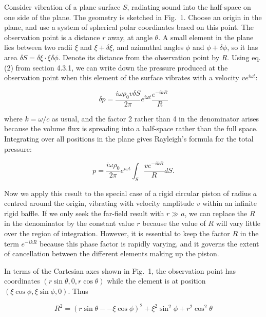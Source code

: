   Consider vibration of a plane surface $S$, radiating sound into the 
  half-space on one side of the plane. The geometry is sketched in Fig.\ 1. 
  Choose an origin in the plane, and use a system of spherical polar 
  coordinates based on this point. The observation point is a distance $r$ 
  away, at angle $\theta$. A small element in the plane lies between two radii 
  $\xi$ and $\xi+\delta \xi$, and azimuthal angles $\phi$ and $\phi + \delta 
  \phi$, so it has area $\delta S= \delta \xi \cdot \xi \delta \phi$. Denote 
  its distance from the observation point by $R$. Using eq. (2) from section 
  4.3.1, we can write down the pressure produced at the observation point when 
  this element of the surface vibrates with a velocity $v e^{i \omega t}$: 

  $$\delta p = \dfrac{i \omega \rho_0 v \delta S}{2 \pi} e^{i \omega t} 
  \dfrac{e^{-i k R}}{R} \tag{1}$$ 

  where $k=\omega /c$ as usual, and the factor 2 rather than 4 in the 
  denominator arises because the volume flux is spreading into a half-space 
  rather than the full space. Integrating over all positions in the plane gives 
  Rayleigh's formula for the total pressure: 

  $$p = \dfrac{i \omega \rho_0}{2 \pi} e^{i \omega t} \int_S{\dfrac{v e^{-i k 
  R}}{R} dS} . \tag{2}$$ 


  Now we apply this result to the special case of a rigid circular piston of 
  radius $a$ centred around the origin, vibrating with velocity amplitude $v$ 
  within an infinite rigid baffle. If we only seek the far-field result with $r 
  \gg a$, we can replace the $R$ in the denominator by the constant value $r$ 
  because the value of $R$ will vary little over the region of integration. 
  However, it is essential to keep the factor $R$ in the term $e^{-ikR}$ 
  because this phase factor is rapidly varying, and it governs the extent of 
  cancellation between the different elements making up the piston. 

  In terms of the Cartesian axes shown in Fig.\ 1, the observation point has 
  coordinates $(r \sin \theta, 0, r \cos \theta)$ while the element is at 
  position $(\xi \cos \phi, \xi \sin \phi, 0)$. Thus 

  $$R^2=(r \sin \theta -- \xi \cos \phi)^2 + \xi^2 \sin^2 \phi + r^2 \cos^2 
  \theta $$ 

